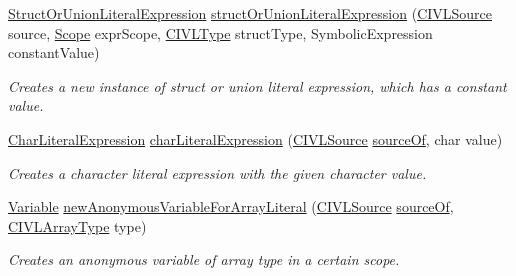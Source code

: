 \begin{DoxyCompactItemize}
\hyperlink{interfaceedu_1_1udel_1_1cis_1_1vsl_1_1civl_1_1model_1_1IF_1_1expression_1_1StructOrUnionLiteralExpression}{Struct\+Or\+Union\+Literal\+Expression} \hyperlink{classedu_1_1udel_1_1cis_1_1vsl_1_1civl_1_1model_1_1common_1_1CommonModelFactory_ab2e3b7a5defd897a449e46321e8e2af9}{struct\+Or\+Union\+Literal\+Expression} (\hyperlink{interfaceedu_1_1udel_1_1cis_1_1vsl_1_1civl_1_1model_1_1IF_1_1CIVLSource}{C\+I\+V\+L\+Source} source, \hyperlink{interfaceedu_1_1udel_1_1cis_1_1vsl_1_1civl_1_1model_1_1IF_1_1Scope}{Scope} expr\+Scope, \hyperlink{interfaceedu_1_1udel_1_1cis_1_1vsl_1_1civl_1_1model_1_1IF_1_1type_1_1CIVLType}{C\+I\+V\+L\+Type} struct\+Type, Symbolic\+Expression constant\+Value)
\begin{DoxyCompactList}\small\item\em Creates a new instance of struct or union literal expression, which has a constant value. \end{DoxyCompactList}\item 
\hyperlink{interfaceedu_1_1udel_1_1cis_1_1vsl_1_1civl_1_1model_1_1IF_1_1expression_1_1CharLiteralExpression}{Char\+Literal\+Expression} \hyperlink{classedu_1_1udel_1_1cis_1_1vsl_1_1civl_1_1model_1_1common_1_1CommonModelFactory_a9fa411622e7f62f67cfddabbe7a770b5}{char\+Literal\+Expression} (\hyperlink{interfaceedu_1_1udel_1_1cis_1_1vsl_1_1civl_1_1model_1_1IF_1_1CIVLSource}{C\+I\+V\+L\+Source} \hyperlink{classedu_1_1udel_1_1cis_1_1vsl_1_1civl_1_1model_1_1common_1_1CommonModelFactory_afd3890efdff35b4597ab7ed14fbeffae}{source\+Of}, char value)
\begin{DoxyCompactList}\small\item\em Creates a character literal expression with the given character value. \end{DoxyCompactList}\item 
\hyperlink{interfaceedu_1_1udel_1_1cis_1_1vsl_1_1civl_1_1model_1_1IF_1_1variable_1_1Variable}{Variable} \hyperlink{classedu_1_1udel_1_1cis_1_1vsl_1_1civl_1_1model_1_1common_1_1CommonModelFactory_a9997aeaaeab44555a66dd95fd3b9a3e2}{new\+Anonymous\+Variable\+For\+Array\+Literal} (\hyperlink{interfaceedu_1_1udel_1_1cis_1_1vsl_1_1civl_1_1model_1_1IF_1_1CIVLSource}{C\+I\+V\+L\+Source} \hyperlink{classedu_1_1udel_1_1cis_1_1vsl_1_1civl_1_1model_1_1common_1_1CommonModelFactory_afd3890efdff35b4597ab7ed14fbeffae}{source\+Of}, \hyperlink{interfaceedu_1_1udel_1_1cis_1_1vsl_1_1civl_1_1model_1_1IF_1_1type_1_1CIVLArrayType}{C\+I\+V\+L\+Array\+Type} type)
\begin{DoxyCompactList}\small\item\em Creates an anonymous variable of array type in a certain scope. \end{DoxyCompactList}\item 

\end{DoxyCompactItemize}
